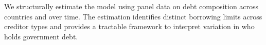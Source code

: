 \documentclass[\latexroot/\projectname]{subfiles}
\begin{document}
We structurally estimate the model using panel data on debt composition across
countries and over time. The estimation identifies distinct borrowing limits
across creditor types and provides a tractable framework to interpret
variation in who holds government debt.

\smartbib
\end{document}
